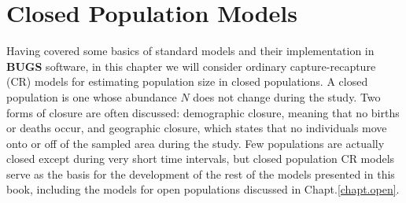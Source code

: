 \chapter{
 Closed Population Models
}
\label{chapt.closed}

\vspace{.3in}

Having covered some basics of standard %
models and their implementation in \textbf{BUGS} software,
in this chapter we will consider ordinary capture-recapture (CR)
models for estimating population size in closed populations. A closed
population is one whose abundance $N$ does not change during the
study. Two forms of closure are often discussed: demographic closure,
meaning that no births or deaths occur, and geographic closure, which
states that no individuals move onto or off of the sampled area during the study.
Few populations are actually closed except during very short
time intervals, but closed population CR models serve as the basis for
the development of the rest of the models presented in this book,
including the models for open populations discussed in
Chapt.\ref{chapt.open}.

